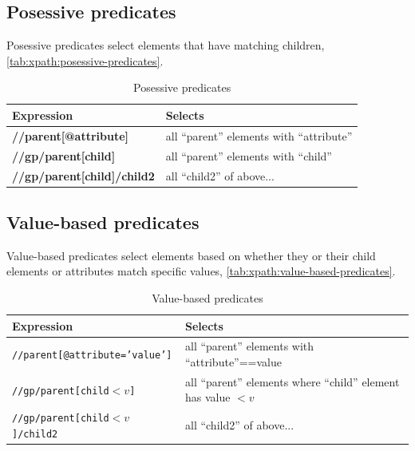 \documentclass{pgnotes}
\begin{document}
\subsection{Posessive predicates}

Posessive predicates select elements that have matching children, \autoref{tab:xpath:posessive-predicates}. 

\begin{table}[htbp]
  \centering
  \begin{tabularx}{1.0\linewidth}{l X}
    \toprule
    \textbf{Expression} & \textbf{Selects} \\
    \midrule
    \textbf{//parent[@attribute]} &  all ``parent'' elements with  ``attribute'' \\
    \textbf{//gp/parent[child]} & all ``parent'' elements with ``child'' \\
    \textbf{//gp/parent[child]/child2} &  all ``child2'' of above... \\
    \bottomrule
  \end{tabularx}
  \caption{Posessive predicates}
  \label{tab:xpath:posessive-predicates}
\end{table}

\subsection{Value-based predicates}

Value-based predicates select elements based on whether they or their child elements or attributes match specific values, \autoref{tab:xpath:value-based-predicates}. 

  \begin{table}[htbp]
    \centering
    \begin{tabularx}{1.0\linewidth}{l X}
      \toprule
      \textbf{Expression} & \textbf{Selects} \\
      \midrule
      \texttt{//parent[@attribute='value']} &  all ``parent'' elements with ``attribute''==value \\
      \texttt{//gp/parent[child$<v$]} &  all ``parent'' elements where ``child'' element has value $<v$ \\
      \texttt{//gp/parent[child$<v$]/child2} &  all ``child2'' of above... \\
      \bottomrule
    \end{tabularx}
    \caption{Value-based predicates}
    \label{tab:xpath:value-based-predicates}
  \end{table}
\end{document}
